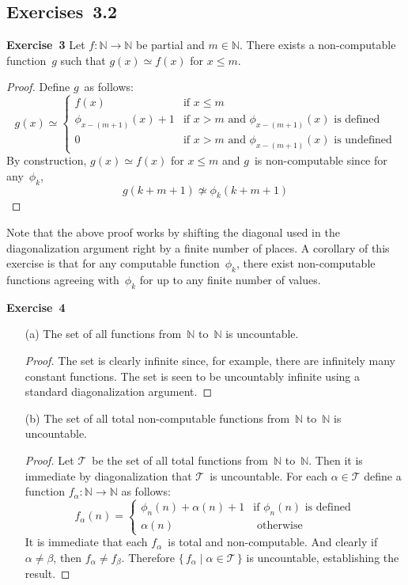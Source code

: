 \documentclass[letterpaper]{article}
\newcommand{\exercise}[2][]{\noindent\textbf{Exercise~{#2}}\ifthenelse{\isempty{#1}}{\textbf{.}}{ ({#1})\textbf{.}}}
\newcommand{\T}{\mathcal{T}}
\newcommand{\N}{\mathbb{N}}
\theoremstyle{plain}
\theoremstyle{definition}
\theoremstyle{remark}
\begin{document}
\subsection*{Exercises~3.2}
\exercise{3}
Let $f:\N\to\N$ be partial and $m\in\N$. There exists a non-computable function~$g$ such that $g(x)\simeq f(x)$ for $x\le m$.
\begin{proof}
Define $g$~as follows:
$$g(x)\simeq\begin{cases}
f(x)&\text{if }x\le m\\
\phi_{x-(m+1)}(x)+1&\text{if }x>m\text{ and }\phi_{x-(m+1)}(x)\text{ is defined}\\
0&\text{if }x>m\text{ and }\phi_{x-(m+1)}(x)\text{ is undefined}
\end{cases}$$
By construction, $g(x)\simeq f(x)$ for $x\le m$ and $g$~is non-computable since for any~$\phi_k$,
$$g(k+m+1)\not\simeq\phi_k(k+m+1)$$
\end{proof}
\noindent Note that the above proof works by shifting the diagonal used in the diagonalization argument right by a finite number of places. A corollary of this exercise is that for any computable function~$\phi_k$, there exist non-computable functions agreeing with~$\phi_k$ for up to any finite number of values. 

\bigskip
\exercise{4}
\begin{enumerate}[itemsep=0pt]
\item[(a)] The set of all functions from~$\N$ to~$\N$ is uncountable.
\begin{proof}
The set is clearly infinite since, for example, there are infinitely many constant functions. The set is seen to be uncountably infinite using a standard diagonalization argument.
\end{proof}
\item[(b)] The set of all total non-computable functions from~$\N$ to~$\N$ is uncountable.
\begin{proof}
Let $\T$~be the set of all total functions from~$\N$ to~$\N$. Then it is immediate by diagonalization that $\T$~is uncountable. For each $\alpha\in\T$ define a function $f_{\alpha}:\N\to\N$ as follows:
$$f_{\alpha}(n)=\begin{cases}
\phi_n(n)+\alpha(n)+1&\text{if }\phi_n(n)\text{ is defined}\\
\alpha(n)&\text{ otherwise}
\end{cases}$$
It is immediate that each $f_{\alpha}$~is total and non-computable. And clearly if $\alpha\ne\beta$, then $f_{\alpha}\ne f_{\beta}$. Therefore $\{\,f_{\alpha}\mid\alpha\in\T\,\}$ is uncountable, establishing the result.
\end{proof}
\end{enumerate}
\end{document}
